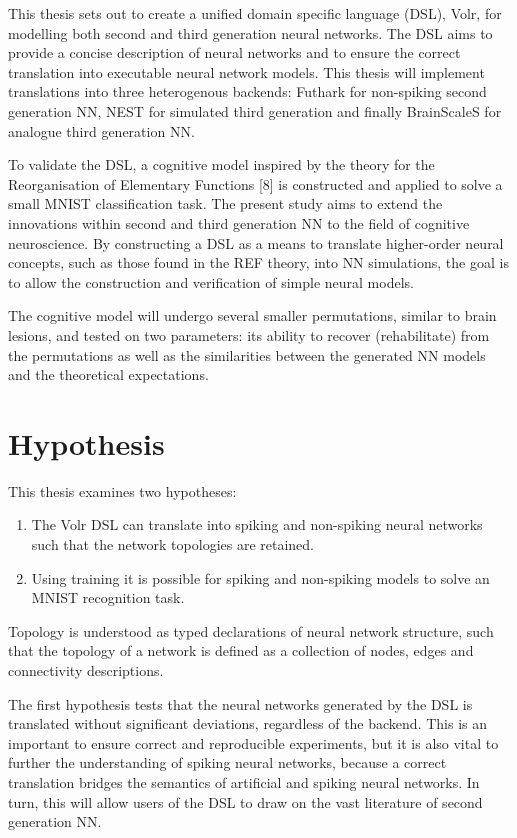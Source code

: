 \documentclass[report.tex]{subfiles}
\begin{document}
This thesis sets out to create a unified domain specific language (DSL), Volr, 
for modelling both second and third generation neural networks.
The DSL aims to provide a concise description of neural networks and to 
ensure the correct translation into executable neural network models.
This thesis will implement translations into three heterogenous backends: 
Futhark for non-spiking second generation \gls{NN}, NEST for simulated third
generation  and finally
BrainScaleS for analogue third generation \gls{NN}. 

To validate the DSL, a cognitive model inspired by the theory for the Reorganisation
of Elementary Functions [8] is constructed and applied to solve a small MNIST classification task.
The present study aims to extend the innovations within
second and third generation \gls{NN} to the field of
cognitive  neuroscience. 
By constructing a \gls{DSL} as a means to translate higher-order
neural concepts, such as those found in the \gls{REF} theory, 
into \gls{NN} simulations, the goal is to allow
the construction and verification of simple neural models.

The cognitive model will undergo several smaller permutations, similar
to brain lesions, and tested on two parameters: 
  its ability to recover (rehabilitate) from the permutations
  as well as
  the similarities between the generated \gls{NN} models and the
  theoretical expectations.
\section{Hypothesis} \label{ref:hypothesis}
This thesis examines two hypotheses:

\begin{enumerate}
  \item The Volr DSL can translate into spiking and non-spiking neural networks such that the network topologies are retained.
  \item Using training it is possible for spiking and non-spiking models to solve an MNIST recognition task.
\end{enumerate}

Topology is understood as typed declarations of neural network structure, such
that the topology of a network is defined as a collection of nodes, edges and connectivity descriptions.

The first hypothesis tests that the neural networks generated by the DSL is translated without significant
deviations, regardless of the backend.
This is an important to ensure correct and reproducible experiments,
but it is also vital to further the understanding of spiking neural networks, because
a correct translation bridges the semantics of artificial and spiking neural networks.
In turn, this will allow users of the DSL to draw on the vast literature of
second generation \gls{NN}.
\end{document}
